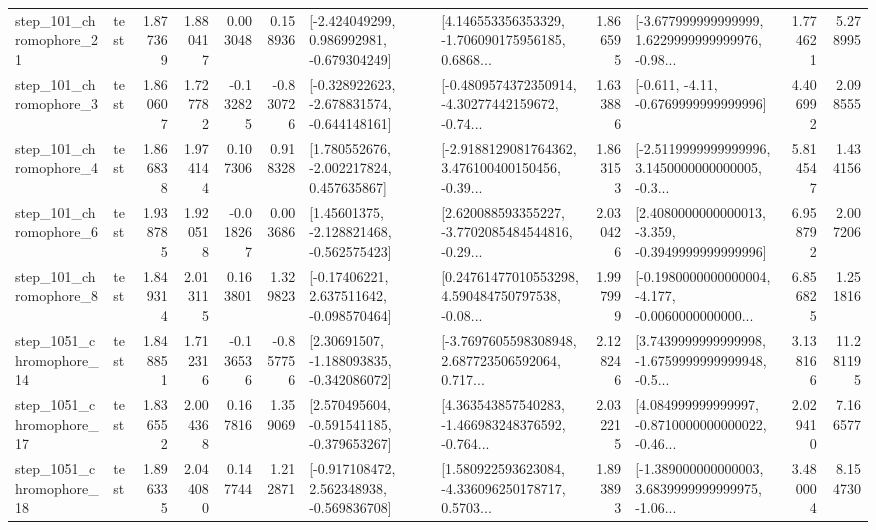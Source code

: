 \begin{tabular}{llrrrrllrlrr}
  step\_101\_chromophore\_21 &      test &      1.877369 &    1.880417 &      0.003048 &  0.158936 &   [-2.424049299, 0.986992981, -0.679304249] &  [4.146553356353329, -1.706090175956185, 0.6868... &       1.866595 &  [-3.677999999999999, 1.6229999999999976, -0.98... &            1.774621 &          5.278995 \\
   step\_101\_chromophore\_3 &      test &      1.860607 &    1.727782 &     -0.132825 & -0.830726 &  [-0.328922623, -2.678831574, -0.644148161] &  [-0.4809574372350914, -4.30277442159672, -0.74... &       1.633886 &               [-0.611, -4.11, -0.6769999999999996] &            4.406992 &          2.098555 \\
   step\_101\_chromophore\_4 &      test &      1.866838 &    1.974144 &      0.107306 &  0.918328 &    [1.780552676, -2.002217824, 0.457635867] &  [-2.9188129081764362, 3.476100400150456, -0.39... &       1.863153 &  [-2.5119999999999996, 3.1450000000000005, -0.3... &            5.814547 &          1.434156 \\
   step\_101\_chromophore\_6 &      test &      1.938785 &    1.920518 &     -0.018267 &  0.003686 &    [1.45601375, -2.128821468, -0.562575423] &  [2.620088593355227, -3.7702085484544816, -0.29... &       2.030426 &  [2.4080000000000013, -3.359, -0.3949999999999996] &            6.958792 &          2.007206 \\
   step\_101\_chromophore\_8 &      test &      1.849314 &    2.013115 &      0.163801 &  1.329823 &    [-0.17406221, 2.637511642, -0.098570464] &  [0.24761477010553298, 4.590484750797538, -0.08... &       1.997999 &  [-0.1980000000000004, -4.177, -0.0060000000000... &            6.856825 &          1.251816 \\
 step\_1051\_chromophore\_14 &      test &      1.848851 &    1.712316 &     -0.136536 & -0.857756 &    [2.30691507, -1.188093835, -0.342086072] &  [-3.7697605598308948, 2.687723506592064, 0.717... &       2.128246 &  [3.7439999999999998, -1.6759999999999948, -0.5... &            3.138166 &         11.281195 \\
 step\_1051\_chromophore\_17 &      test &      1.836552 &    2.004368 &      0.167816 &  1.359069 &   [2.570495604, -0.591541185, -0.379653267] &  [4.363543857540283, -1.466983248376592, -0.764... &       2.032215 &  [4.084999999999997, -0.8710000000000022, -0.46... &            2.029410 &          7.166577 \\
 step\_1051\_chromophore\_18 &      test &      1.896335 &    2.044080 &      0.147744 &  1.212871 &   [-0.917108472, 2.562348938, -0.569836708] &  [1.580922593623084, -4.336096250178717, 0.5703... &       1.893893 &  [-1.389000000000003, 3.6839999999999975, -1.06... &            3.480004 &          8.154730 \\

\end{tabular}
